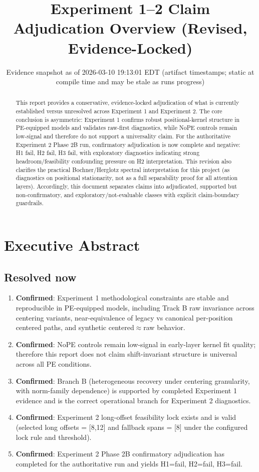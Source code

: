 \documentclass[11pt]{article}
\title{Experiment 1--2 Claim Adjudication Overview (Revised, Evidence-Locked)}
\author{}
\date{Evidence snapshot as of 2026-03-10 19:13:01 EDT (artifact timestamps; static at compile time and may be stale as runs progress)}
\newcommand{\statusConfirmed}{\textbf{Confirmed}}
\begin{document}
\maketitle

\begin{abstract}
This report provides a conservative, evidence-locked adjudication of what is currently established versus unresolved across Experiment 1 and Experiment 2. The core conclusion is asymmetric: Experiment 1 confirms robust positional-kernel structure in PE-equipped models and validates raw-first diagnostics, while NoPE controls remain low-signal and therefore do not support a universality claim. For the authoritative Experiment 2 Phase 2B run, confirmatory adjudication is now complete and negative: H1 fail, H2 fail, H3 fail, with exploratory diagnostics indicating strong headroom/feasibility confounding pressure on H2 interpretation. This revision also clarifies the practical Bochner/Herglotz spectral interpretation for this project (as diagnostics on positional stationarity, not as a full separability proof for all attention layers). Accordingly, this document separates claims into adjudicated, supported but non-confirmatory, and exploratory/not-evaluable classes with explicit claim-boundary guardrails.
\end{abstract}

\section{Executive Abstract}
\subsection*{Resolved now}
\begin{enumerate}[leftmargin=*]
  \item \statusConfirmed: Experiment 1 methodological constraints are stable and reproducible in PE-equipped models, including Track B raw invariance across centering variants, near-equivalence of legacy vs canonical per-position centered paths, and synthetic centered$\approx$raw behavior.
  \item \statusConfirmed: NoPE controls remain low-signal in early-layer kernel fit quality; therefore this report does not claim shift-invariant structure is universal across all PE conditions.
  \item \statusConfirmed: Branch B (heterogeneous recovery under centering granularity, with norm-family dependence) is supported by completed Experiment 1 evidence and is the correct operational branch for Experiment 2 diagnostics.
  \item \statusConfirmed: Experiment 2 long-offset feasibility lock exists and is valid (selected long offsets = [8,12] and fallback spans = [8] under the configured lock rule and threshold).
  \item \statusConfirmed: Experiment 2 Phase 2B confirmatory adjudication has completed for the authoritative run and yields H1=fail, H2=fail, H3=fail.
\end{enumerate}
\end{document}
